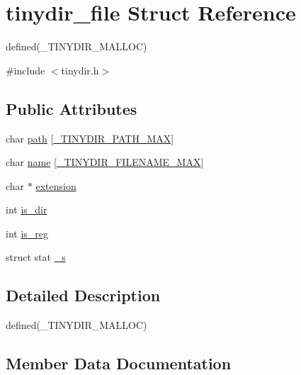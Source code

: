 \hypertarget{structtinydir__file}{}\section{tinydir\+\_\+file Struct Reference}
\label{structtinydir__file}


defined(\+\_\+\+T\+I\+N\+Y\+D\+I\+R\+\_\+\+M\+A\+L\+L\+O\+C)  




{\ttfamily \#include $<$tinydir.\+h$>$}

\subsection*{Public Attributes}
\begin{DoxyCompactItemize}
\item 
char \hyperlink{structtinydir__file_a84d716ed154fb4af871866856af95bdb}{path} \mbox{[}\hyperlink{tinydir_8h_a0851f369d026104769d8a016741f2bc2}{\+\_\+\+T\+I\+N\+Y\+D\+I\+R\+\_\+\+P\+A\+T\+H\+\_\+\+M\+A\+X}\mbox{]}
\item 
char \hyperlink{structtinydir__file_af08987f1603e1cb849d34985ff2d1507}{name} \mbox{[}\hyperlink{tinydir_8h_aa391292d8689f984ca8ce3d70feecdcb}{\+\_\+\+T\+I\+N\+Y\+D\+I\+R\+\_\+\+F\+I\+L\+E\+N\+A\+M\+E\+\_\+\+M\+A\+X}\mbox{]}
\item 
char $\ast$ \hyperlink{structtinydir__file_a0e760decbe09e679a4637d7d0630bf68}{extension}
\item 
int \hyperlink{structtinydir__file_a702617c7ea4fad8a0ebde539eec9e5a7}{is\+\_\+dir}
\item 
int \hyperlink{structtinydir__file_a5d54c59718ccf7ada9fba3aec8c109bf}{is\+\_\+reg}
\item 
struct stat \hyperlink{structtinydir__file_a71140206c03eb005035143ec3032a712}{\+\_\+s}
\end{DoxyCompactItemize}


\subsection{Detailed Description}
defined(\+\_\+\+T\+I\+N\+Y\+D\+I\+R\+\_\+\+M\+A\+L\+L\+O\+C) 

\subsection{Member Data Documentation}
\hypertarget{structtinydir__file_a71140206c03eb005035143ec3032a712}{}
